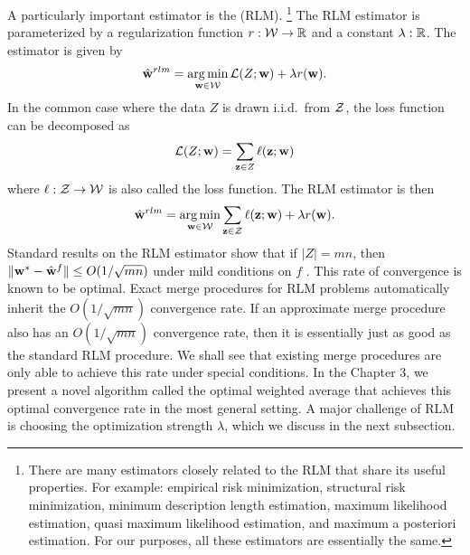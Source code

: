 \documentclass[thesis.tex]{subfiles}
\begin{document}
A particularly important estimator is the  (RLM).%
\footnote{
    There are many estimators closely related to the RLM that share its useful properties.
    For example: 
    empirical risk minimization,
    structural risk minimization,
    minimum description length estimation,
    maximum likelihood estimation, 
    quasi maximum likelihood estimation,
    and maximum a posteriori estimation.
    For our purposes, all these estimators are essentially the same.
}
The RLM estimator is parameterized by a regularization function $r : {\mathcal W} \to \mathbb R$ 
and a constant $\lambda : \mathbb R$.
The estimator is given by
\begin{equation}
    \label{eq:notation:rlm}
    \hat{\mathbf w}^{rlm} = \operatorname*{arg\,min}_{\mathbf w\in{\mathcal W}} \mathcal{L}(Z;\mathbf w) + \lambda r(\mathbf w)
    .
\end{equation}
In the common case where the data $Z$ is drawn i.i.d.\ from ${\mathcal Z}$, the loss function can be decomposed as 
\begin{equation}
    \mathcal{L}(Z;\mathbf w) = \sum_{\mathbf z\in Z} \ell(\mathbf z;\mathbf w)
\end{equation}
where $\ell : {\mathcal Z} \to {\mathcal W}$ is also called the loss function.
The RLM estimator is then
\begin{equation}
    \label{eq:notation:rlm:independent}
    \hat{\mathbf w}^{rlm} = \operatorname*{arg\,min}_{\mathbf w\in{\mathcal W}} \sum_{\mathbf z\in{\mathcal Z}}\ell(\mathbf z;\mathbf w) + \lambda r(\mathbf w)
    .
\end{equation}
Standard results on the RLM estimator show that if $|Z|=mn$,
then ${\lVert {{\mathbf w^{*}}-{\hat{\mathbf w}}^f} \rVert}\le O(1/\sqrt{mn})$ under mild conditions on $f$
\citep[e.g.][]{lehmann1999elements}.
This rate of convergence is known to be optimal.
Exact merge procedures for RLM problems automatically inherit the $O(1/\sqrt{mn})$ convergence rate.
If an approximate merge procedure also has an $O(1/\sqrt{mn})$ convergence rate,
then it is essentially just as good as the standard RLM procedure.
We shall see that existing merge procedures are only able to achieve this rate under special conditions.
In the Chapter 3, we present a novel algorithm called the optimal weighted average that achieves this optimal convergence rate in the most general setting.
A major challenge of RLM is choosing the optimization strength $\lambda$,
which we discuss in the next subsection.
\end{document}
